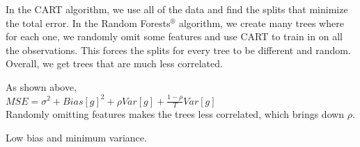\documentclass[12pt]{article}
\begin{document}
\begin{enumerate}
In the CART algorithm, we use all of the data and find the splits that minimize the total error. In the Random Forests$^\circledR$  algorithm, we create many trees where for each one, we randomly omit some features and use CART to train in on all the observations. This forces the splits for every tree to be different and random. Overall, we get trees that are much less correlated. 


As shown above, \\
$MSE = \sigma^2 + Bias[g]^2 + \rho Var[g] + \frac{1 - \rho}{T} Var[g]$ \\
Randomly omitting features makes the trees less correlated, which brings down $\rho$. 


Low bias and minimum variance.  

\end{enumerate}

\end{document}
